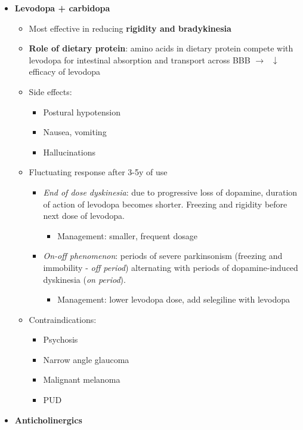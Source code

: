 \documentclass[
  12pt,
]{memoir}
\providecommand{\tightlist}{%
  \setlength{\itemsep}{0pt}\setlength{\parskip}{0pt}}
\begin{document}
\begin{itemize}
\tightlist
\item
  \textbf{Levodopa + carbidopa}

  \begin{itemize}
  \tightlist
  \item
    Most effective in reducing \textbf{rigidity and bradykinesia}
  \item
    \textbf{Role of dietary protein}: amino acids in dietary protein
    compete with levodopa for intestinal absorption and transport across
    BBB \(\rightarrow\;\;\downarrow\) efficacy of levodopa
  \item
    Side effects:

    \begin{itemize}
    \tightlist
    \item
      Postural hypotension
    \item
      Nausea, vomiting
    \item
      Hallucinations
    \end{itemize}
  \item
    Fluctuating response after 3-5y of use

    \begin{itemize}
    \tightlist
    \item
      \emph{End of dose dyskinesia}: due to progressive loss of
      dopamine, duration of action of levodopa becomes shorter. Freezing
      and rigidity before next dose of levodopa.

      \begin{itemize}
      \tightlist
      \item
        Management: smaller, frequent dosage
      \end{itemize}
    \item
      \emph{On-off phenomenon}: periods of severe parkinsonism (freezing
      and immobility - \emph{off period}) alternating with periods of
      dopamine-induced dyskinesia (\emph{on period}).

      \begin{itemize}
      \tightlist
      \item
        Management: lower levodopa dose, add selegiline with levodopa
      \end{itemize}
    \end{itemize}
  \item
    Contraindications:

    \begin{itemize}
    \tightlist
    \item
      Psychosis
    \item
      Narrow angle glaucoma
    \item
      Malignant melanoma
    \item
      PUD
    \end{itemize}
  \end{itemize}
\item
  \textbf{Anticholinergics}


\end{itemize}
\end{document}

